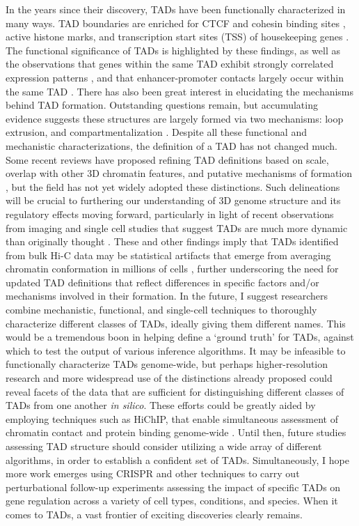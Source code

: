 In the years since their discovery, TADs have been functionally characterized in many ways. TAD boundaries are enriched for CTCF and cohesin binding sites \cite{Dixon.2012, Rao.2014, Bortle.2014}, active histone marks, and transcription start sites (TSS) of housekeeping genes \cite{Szabo.2019, Hou.2012, Ramirez.2018}. The functional significance of TADs is highlighted by these findings, as well as the observations that genes within the same TAD exhibit strongly correlated expression patterns \cite{Nora.2012, Ramirez.2018, Symmons.2014}, and that enhancer-promoter contacts largely occur within the same TAD \cite{Bonev.2017, Symmons.2016, Smith.2016, Delaneau.2019}. There has also been great interest in elucidating the mechanisms behind TAD formation. Outstanding questions remain, but accumulating evidence suggests these structures are largely formed via two mechanisms: loop extrusion, and compartmentalization \cite{Nuebler.2018, Fudenberg.2016, Sanborn.2015, Rowley.2017, Eagen.2017}. Despite all these functional and mechanistic characterizations, the definition of a TAD has not changed much. Some recent reviews have proposed refining TAD definitions based on scale, overlap with other 3D chromatin features, and putative mechanisms of formation \cite{Dixon.2016, Beagan.2020}, but the field has not yet widely adopted these distinctions. Such delineations will be crucial to furthering our understanding of 3D genome structure and its regulatory effects moving forward, particularly in light of recent observations from imaging and single cell studies that suggest TADs are much more dynamic than originally thought \cite{Gizzi.2020, Finn.2019}. These and other findings imply that TADs identified from bulk Hi-C data may be statistical artifacts that emerge from averaging chromatin conformation in millions of cells \cite{Wit.2019}, further underscoring the need for updated TAD definitions that reflect differences in specific factors and/or mechanisms involved in their formation. In the future, I suggest researchers combine mechanistic, functional, and single-cell techniques to thoroughly characterize different classes of TADs, ideally giving them different names. This would be a tremendous boon in helping define a `ground truth' for TADs, against which to test the output of various inference algorithms. It may be infeasible to functionally characterize TADs genome-wide, but perhaps higher-resolution research and more widespread use of the distinctions already proposed could reveal facets of the data that are sufficient for distinguishing different classes of TADs from one another \textit{in silico}. These efforts could be greatly aided by employing techniques such as HiChIP, that enable simultaneous assessment of chromatin contact and protein binding genome-wide \cite{Mumbach.2016}. Until then, future studies assessing TAD structure should consider utilizing a wide array of different algorithms, in order to establish a confident set of TADs. Simultaneously, I hope more work emerges using CRISPR and other techniques to carry out perturbational follow-up experiments assessing the impact of specific TADs on gene regulation across a variety of cell types, conditions, and species. When it comes to TADs, a vast frontier of exciting discoveries clearly remains.

